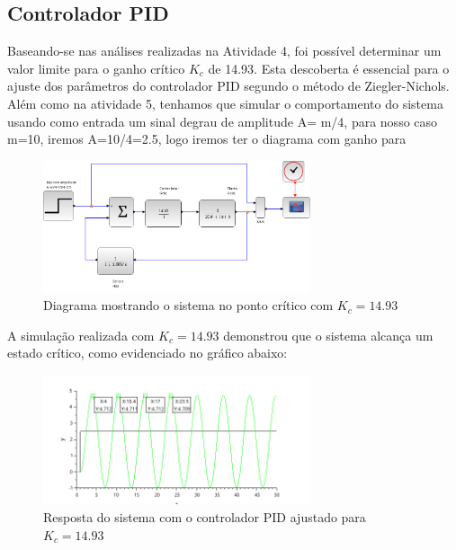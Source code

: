 \subsection{Controlador PID}

Baseando-se nas análises realizadas na Atividade 4, foi possível determinar um valor limite para o ganho crítico \( K_c \) de 14.93. Esta descoberta é essencial para o ajuste dos parâmetros do controlador PID segundo o método de Ziegler-Nichols.
Além como na atividade 5, tenhamos que simular o comportamento do sistema usando como entrada um sinal degrau de amplitude A= m/4, para nosso caso m=10, iremos A=10/4=2.5, logo iremos ter o diagrama com ganho  para  

\begin{figure}[H]
    \centering
    \includegraphics[width=0.7\textwidth]{6-atividade/assets/a/diagrama-ganho-critico-sistema-instavel.png}
    \caption{Diagrama mostrando o sistema no ponto crítico com \( K_c = 14.93 \)}
    \label{fig:diagrama-ponto-critico}
\end{figure}

A simulação realizada com \( K_c = 14.93 \) demonstrou que o sistema alcança um estado crítico, como evidenciado no gráfico abaixo:

\begin{figure}[H]
    \centering
    \includegraphics[width=0.7\textwidth]{6-atividade/assets/a/ganho-critico-sistema-instavel.png}
    \caption{Resposta do sistema com o controlador PID ajustado para \( K_c = 14.93 \)}
    \label{fig:ganho-critico-sistema-instavel}
\end{figure}



